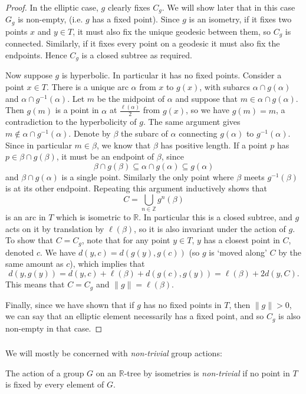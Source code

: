 \begin{proof}
    In the elliptic case, $g$ clearly fixes $C_g$. We will show later that in this case $G_g$ is non-empty, (i.e. $g$ has a fixed point). Since $g$ is an isometry, if it fixes two points $x$ and $y\in T$, it must also fix the unique geodesic between them, so $C_g$ is connected. Similarly, if it fixes every point on a geodesic it must also fix the endpoints. Hence $C_g$ is a closed subtree as required.

    Now suppose $g$ is hyperbolic. In particular it has no fixed points. Consider a point $x\in T$. There is a unique arc $\alpha$ from $x$ to $g(x)$, with subarcs $\alpha \cap g(\alpha)$ and $\alpha \cap g^{-1}(\alpha)$. Let $m$ be the midpoint of $\alpha$ and suppose that $m\in \alpha \cap g(\alpha)$. Then $g(m)$ is a point in $\alpha$ at $\frac{\ell(\alpha)}{2}$ from $g(x)$, so we have $g(m)=m$, a contradiction to the hyperbolicity of $g$. The same argument gives $m\notin \alpha \cap g^{-1}(\alpha)$. Denote by $\beta$ the subarc of $\alpha$ connecting $g(\alpha)$ to $g^{-1}(\alpha)$. Since in particular $m\in \beta$, we know that $\beta$ has positive length. If a point $p$ has $p\in \beta \cap g(\beta)$, it must be an endpoint of $\beta$, since \[\beta\cap g(\beta)\subseteq\alpha\cap g(\alpha)\subseteq g(\alpha)\] and $\beta\cap g(\alpha)$ is a single point. Similarly the only point where $\beta$ meets $g^{-1}(\beta)$ is at its other endpoint. Repeating this argument inductively shows that \[C=\underset{n\in\mathbb{Z}}{\bigcup}g^n(\beta)\] is an arc in $T$ which is isometric to $\mathbb{R}$. In particular this is a closed subtree, and $g$ acts on it by translation by $\ell(\beta)$, so it is also invariant under the action of $g$. To show that $C=C_g$, note that for any point $y\in T$, $y$ has a closest point in $C$, denoted $c$. We have $d(y,c)=d(g(y),g(c))$ (so $g$ is `moved along' %
    $C$ by the same amount as $c$), which implies that \[d(y,g(y))=d(y,c)+\ell(\beta)+d(g(c),g(y))=\ell(\beta)+2d(y,C).\] This means that $C=C_g$ and $\lVert g\rVert=\ell(\beta)$.

    Finally, since we have shown that if $g$ has no fixed points in $T$, then $\lVert g\rVert>0$, we can say that an elliptic element necessarily has a fixed point, and so $C_g$ is also non-empty in that case.
\end{proof}
\subsubsection{}
We will mostly be concerned with \textit{non-trivial} group actions:
\begin{definition}
    The action of a group $G$ on an $\mathbb{R}$-tree by isometries is \emph{non-trivial} if no point in $T$ is fixed by every element of $G$.
\end{definition}

